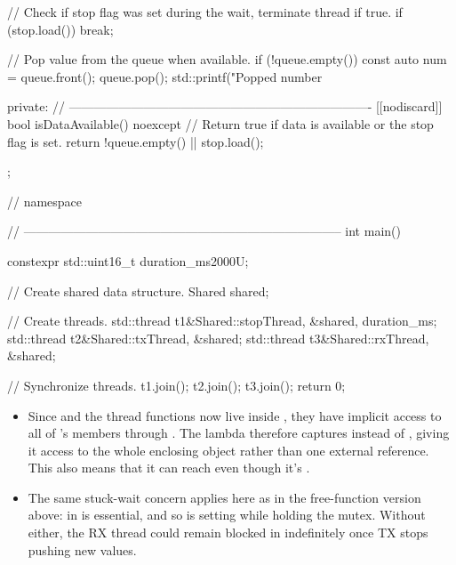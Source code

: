 \begin{cppcode}
{{{{{                // Check if stop flag was set during the wait, terminate thread if true.
                if (stop.load()) { break; }

                // Pop value from the queue when available.
                if (!queue.empty())
                {
                    const auto num = queue.front();
                    queue.pop();
                    std::printf("Popped number %
                }
            }
        }
    }

private:
    // -------------------------------------------------------------------------
    [[nodiscard]] bool isDataAvailable() noexcept
    {
        // Return true if data is available or the stop flag is set.
        return !queue.empty() || stop.load();
    }

};
} // namespace

// -----------------------------------------------------------------------------
int main()
{
    constexpr std::uint16_t duration_ms{2000U};

    // Create shared data structure.
    Shared shared{};

    // Create threads.
    std::thread t1{&Shared::stopThread, &shared, duration_ms};
    std::thread t2{&Shared::txThread, &shared};
    std::thread t3{&Shared::rxThread, &shared};

    // Synchronize threads.
    t1.join();
    t2.join();
    t3.join();
    return 0;
}
\end{cppcode}

\note[Notes]
\begin{itemize}
  \item Since  and the thread functions now live inside , they
    have implicit access to all of 's members through . The lambda
    therefore captures \code{[this]} instead of \code{[&shared]}, giving it access to the whole
    enclosing object rather than one external reference. This also means that it can reach
     even though it's .
  \item The same stuck-wait concern applies here as in the free-function version above:
     in  is essential, and so is setting  while
    holding the mutex. Without either, the RX thread could remain blocked in
     indefinitely once TX stops pushing new values.
\end{itemize}

